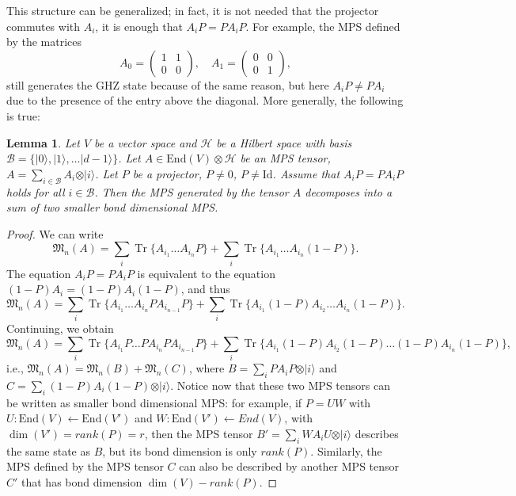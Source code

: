 \documentclass{article}
\newtheorem{lemma}{Lemma}
\newcommand{\tr}{\operatorname{Tr}}
\newcommand{\id}{\mathrm{Id}}
\newcommand{\End}{\mathrm{End}}
\newcommand{\ket}[1]{\vert #1 \rangle}
\begin{document}
This structure can be generalized; in fact, it is not needed that the projector commutes with $A_i$, it is enough that $A_i P = PA_i P$. For example, the MPS defined by the matrices
\begin{equation*}
  A_0 = \left(\begin{matrix}
    1 & 1 \\ 0 & 0 
  \end{matrix}\right), \quad 
  A_1 = \left(\begin{matrix}
    0 & 0 \\ 0 & 1 
  \end{matrix}\right),
\end{equation*}
still generates the GHZ state because of the same reason, but here $A_i P \neq  PA_i$ due to the presence of the entry above the diagonal. More generally, the following is true:

\begin{lemma}\label{lem:decompose}
  Let $V$ be a vector space and $\mathcal{H}$ be a Hilbert space with basis $\mathcal{B} = \{\ket{0},\ket{1},\dots \ket{d-1}\}$. Let $A\in \End(V)\otimes \mathcal{H}$ be an MPS tensor, $A = \sum_{i\in\mathcal{B}} A_i \otimes \ket{i}$. Let $P$ be a projector, $P\neq0$, $P\neq \id$. Assume that $A_{i} P= PA_{i} P$ holds for all $i\in\mathcal{B}$. Then the MPS generated by the tensor $A$ decomposes into a sum of two smaller bond dimensional MPS.
\end{lemma}

\begin{proof}
We can write
  \begin{equation*}
    \mathfrak{M}_n(A) = \sum_i \tr\{A_{i_1} \dots A_{i_n} P\} + \sum_i \tr\{A_{i_1} \dots A_{i_n} (1-P)\}.
  \end{equation*}
  The equation $A_i P = PA_i P$ is equivalent to the equation $(1-P)A_i = (1-P) A_i (1-P)$, and thus 
  \begin{equation*}
    \mathfrak{M}_n(A) = \sum_i \tr\{A_{i_1} \dots A_{i_n} P A_{i_{n-1}} P\} + \sum_i \tr\{A_{i_1} (1-P) A_{i_2} \dots A_{i_n} (1-P)\}.
  \end{equation*}
  Continuing, we obtain 
  \begin{equation*}
    \mathfrak{M}_n(A) = \sum_i \tr\{A_{i_1}P \dots PA_{i_n} P A_{i_{n-1}} P\} + \sum_i \tr\{A_{i_1} (1-P) A_{i_2}(1-P) \dots (1-P)A_{i_n} (1-P)\},
  \end{equation*}
  i.e., $\mathfrak{M}_n(A) = \mathfrak{M}_n(B) + \mathfrak{M}_n(C)$, where $B= \sum_i PA_i P \otimes \ket{i}$ and $C = \sum_i (1-P) A_i (1-P)\otimes \ket{i}$. Notice now that these two MPS tensors can be written as smaller bond dimensional MPS: for example, if $P = UW$ with $U:\End(V)\leftarrow \End(V')$ and $W:\End(V')\leftarrow End(V)$, with $\dim(V') = rank(P) = r$, then the MPS tensor $B' = \sum_i WA_iU \otimes \ket{i}$ describes the same state as $B$, but its bond dimension is only $rank(P)$. Similarly, the MPS defined by the MPS tensor $C$ can also be described by another MPS tensor $C'$ that has bond dimension $\dim(V)-rank(P)$.
\end{proof}
\end{document}

